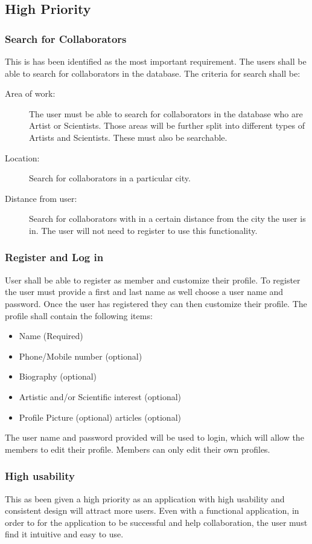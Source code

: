 \documentclass[a4paper,oneside,11pt]{report}
\begin{document}
\subsection{High Priority}
\subsubsection{Search for Collaborators} 
This is has been identified as the most important requirement. The users shall be able to search for collaborators in the database. The criteria for search shall be:
\begin{description}
	\item[Area of work:] The user must be able to search for collaborators in the database who are Artist or Scientists. Those areas will be further split into different types of Artists and Scientists. These must also be searchable.
	\item[Location:] Search for collaborators in a particular city.
	\item[Distance from user:] Search for collaborators with in a certain distance from the city the user is in. The user will not need to register to use this functionality.
\end{description}
	
\subsubsection{Register and Log in} 
 User shall be able to register as member and customize their profile. To register the user must provide a first and last name as well choose a user name and password. Once the user has registered they can then customize their profile. The profile shall contain the following items:
 \begin{itemize}
 \item Name (Required)
 \item Phone/Mobile number (optional)
 \item Biography (optional)
 \item Artistic and/or Scientific interest (optional)
 \item Profile Picture (optional) articles (optional)
 \end{itemize}
 The user name and password provided will be used to login, which will allow the members to edit their profile.
 	Members can only edit their own profiles.
\subsubsection{High usability} 
This as been given a high priority as an application with high usability and consistent design will attract more users. Even with a functional application, in order to for the application to be successful and help collaboration, the user must find it intuitive and easy to use.
\end{document}
